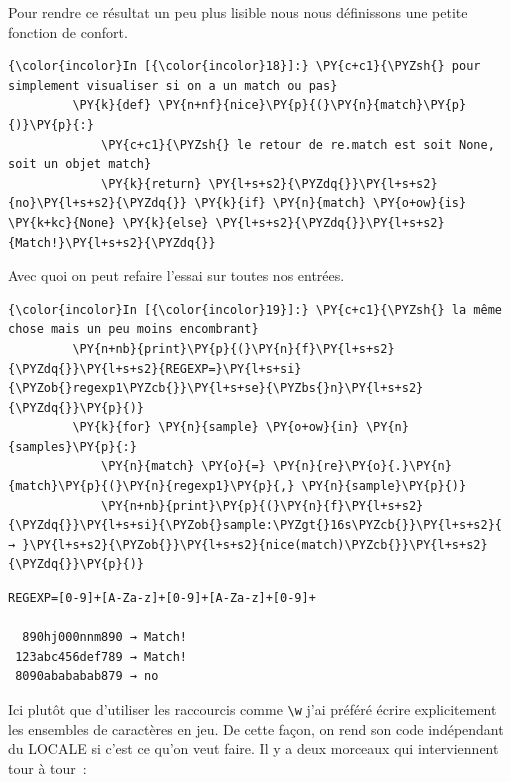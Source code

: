     Pour rendre ce résultat un peu plus lisible nous nous définissons une
petite fonction de confort.

    \begin{Verbatim}[commandchars=\\\{\}]
{\color{incolor}In [{\color{incolor}18}]:} \PY{c+c1}{\PYZsh{} pour simplement visualiser si on a un match ou pas}
         \PY{k}{def} \PY{n+nf}{nice}\PY{p}{(}\PY{n}{match}\PY{p}{)}\PY{p}{:}
             \PY{c+c1}{\PYZsh{} le retour de re.match est soit None, soit un objet match}
             \PY{k}{return} \PY{l+s+s2}{\PYZdq{}}\PY{l+s+s2}{no}\PY{l+s+s2}{\PYZdq{}} \PY{k}{if} \PY{n}{match} \PY{o+ow}{is} \PY{k+kc}{None} \PY{k}{else} \PY{l+s+s2}{\PYZdq{}}\PY{l+s+s2}{Match!}\PY{l+s+s2}{\PYZdq{}}
\end{Verbatim}


    Avec quoi on peut refaire l'essai sur toutes nos entrées.

    \begin{Verbatim}[commandchars=\\\{\}]
{\color{incolor}In [{\color{incolor}19}]:} \PY{c+c1}{\PYZsh{} la même chose mais un peu moins encombrant}
         \PY{n+nb}{print}\PY{p}{(}\PY{n}{f}\PY{l+s+s2}{\PYZdq{}}\PY{l+s+s2}{REGEXP=}\PY{l+s+si}{\PYZob{}regexp1\PYZcb{}}\PY{l+s+se}{\PYZbs{}n}\PY{l+s+s2}{\PYZdq{}}\PY{p}{)}
         \PY{k}{for} \PY{n}{sample} \PY{o+ow}{in} \PY{n}{samples}\PY{p}{:}
             \PY{n}{match} \PY{o}{=} \PY{n}{re}\PY{o}{.}\PY{n}{match}\PY{p}{(}\PY{n}{regexp1}\PY{p}{,} \PY{n}{sample}\PY{p}{)}
             \PY{n+nb}{print}\PY{p}{(}\PY{n}{f}\PY{l+s+s2}{\PYZdq{}}\PY{l+s+si}{\PYZob{}sample:\PYZgt{}16s\PYZcb{}}\PY{l+s+s2}{ → }\PY{l+s+s2}{\PYZob{}}\PY{l+s+s2}{nice(match)\PYZcb{}}\PY{l+s+s2}{\PYZdq{}}\PY{p}{)}
\end{Verbatim}


    \begin{Verbatim}[commandchars=\\\{\}]
REGEXP=[0-9]+[A-Za-z]+[0-9]+[A-Za-z]+[0-9]+

  890hj000nnm890 → Match!
 123abc456def789 → Match!
 8090abababab879 → no

    \end{Verbatim}

    Ici plutôt que d'utiliser les raccourcis comme
\texttt{\textbackslash{}w} j'ai préféré écrire explicitement les
ensembles de caractères en jeu. De cette façon, on rend son code
indépendant du LOCALE si c'est ce qu'on veut faire. Il y a deux morceaux
qui interviennent tour à tour~:

